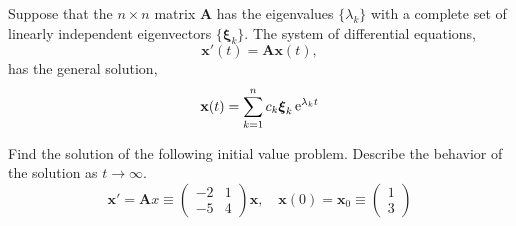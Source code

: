 \begin{Result}
  Suppose that the $n \times n$ matrix $\mathbf{A}$ has the eigenvalues $\{ \lambda_k \}$ 
  with a complete set of linearly independent eigenvectors $\{ \boldsymbol{\xi}_k \}$.
  The system of differential equations,
  \[
  \mathbf{x}'(t) = \mathbf{A} \mathbf{x}(t),
  \]
  has the general solution,
  \[
  \mathbf{x}(t) = \sum_{k = 1}^n c_k \boldsymbol{\xi}_k \mathop{\mathrm{e}}\nolimits^{\lambda_k t}
  \]
\end{Result}









\begin{Example}
  Find the solution of the following initial value problem.
  Describe the behavior of the solution as $t \to \infty$.
  \[
  \mathbf{x}' = \mathbf{A} x \equiv
  \begin{pmatrix}
    -2 & 1\\
    -5 & 4
  \end{pmatrix} 
  \mathbf{x}, \quad 
  \mathbf{x}(0) = \mathbf{x}_0 \equiv
  \begin{pmatrix}
    1\\
    3
  \end{pmatrix}
  \]


\end{Example}
